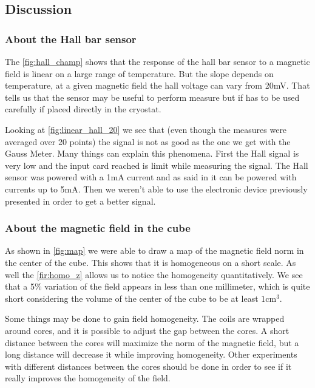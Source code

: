 \documentclass[journal]{IEEEtran}
\begin{document}
\subsection{Discussion}

\subsubsection{About the Hall bar sensor}

The \figurename \ref{fig:hall_champ} shows that the response of the hall bar sensor to a magnetic field is linear on a large range of temperature. But the slope depends on temperature, at a given magnetic field the hall voltage can vary from 20mV. That tells us that the sensor may be useful to perform measure but if has to be used carefully if placed directly in the cryostat.

Looking at \figurename \ref{fig:linear_hall_20} we see that (even though the measures were averaged over 20 points) the signal is not as good as the one we get with the Gauss Meter. Many things can explain this phenomena. First the Hall signal is very low and the input card reached is limit while measuring the signal. The Hall sensor was powered with a 1mA current and as said in \cite{toshiba} it can be powered with currents up to 5mA. Then we weren't able to use the electronic device previously presented in order to get a better signal. 

\subsubsection{About the magnetic field in the cube}

As shown in \figurename \ref{fig:map} we were able to draw a map of the magnetic field norm in the center of the cube. This shows that it is homogeneous on a short scale. As well the \figurename \ref{fir:homo_z} allows us to notice the homogeneity quantitatively. We see that a 5\% variation of the field appears in less than one millimeter, which is quite short considering the volume of the center of the cube to be at least $1\mathrm{cm^3}$.

Some things may be done to gain field homogeneity. The coils are wrapped around cores, and it is possible to adjust the gap between the cores. A short distance between the cores will maximize the norm of the magnetic field, but a long distance will decrease it while improving homogeneity. Other experiments with different distances between the cores should be done in order to see if it really improves the homogeneity of the field.
\end{document}
